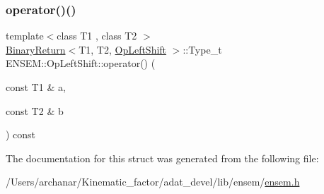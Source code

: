 \mbox{\label{structENSEM_1_1OpLeftShift_adf50631f48cb1f93f10fdb26256f19b6}} 
\subsubsection{\texorpdfstring{operator()()}{operator()()}\hspace{0.1cm}{\footnotesize\ttfamily [2/2]}}
{\footnotesize\ttfamily template$<$class T1 , class T2 $>$ \\
\mbox{\hyperlink{structENSEM_1_1BinaryReturn}{Binary\+Return}}$<$T1, T2, \mbox{\hyperlink{structENSEM_1_1OpLeftShift}{Op\+Left\+Shift}} $>$\+::Type\+\_\+t E\+N\+S\+E\+M\+::\+Op\+Left\+Shift\+::operator() (\begin{DoxyParamCaption}\item[{const T1 \&}]{a,  }\item[{const T2 \&}]{b }\end{DoxyParamCaption}) const\hspace{0.3cm}{\ttfamily [inline]}}



The documentation for this struct was generated from the following file\+:\begin{DoxyCompactItemize}
\item 
/\+Users/archanar/\+Kinematic\+\_\+factor/adat\+\_\+devel/lib/ensem/\mbox{\hyperlink{lib_2ensem_2ensem_8h}{ensem.\+h}}\end{DoxyCompactItemize}
